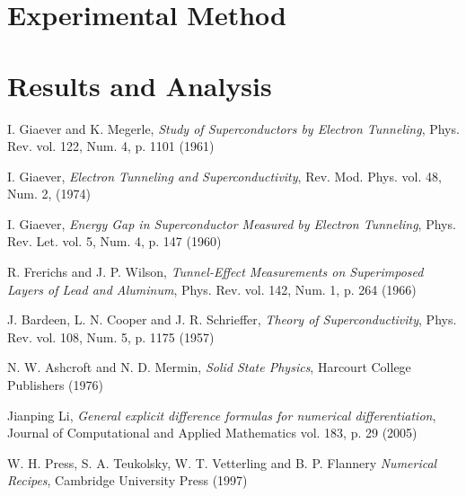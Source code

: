 \documentclass[twocolumn, twoside,a4paper,10pt]{article}
\begin{document}
\section{Experimental Method}



\section{Results and Analysis}





\begin{thebibliography}{99}

 I. Giaever and K. Megerle, \emph{Study of Superconductors by Electron Tunneling}, Phys. Rev. vol. 122, Num. 4, p. 1101 (1961)

 I. Giaever, \emph{Electron Tunneling and Superconductivity}, Rev. Mod. Phys. vol. 48, Num. 2, (1974)

 I. Giaever, \emph{Energy Gap in Superconductor Measured by Electron Tunneling}, Phys. Rev. Let. vol. 5, Num. 4, p. 147 (1960)

 R. Frerichs and J. P. Wilson, \emph{Tunnel-Effect Measurements on Superimposed Layers of Lead and Aluminum}, Phys. Rev. vol. 142, Num. 1, p. 264 (1966)

 J. Bardeen, L. N. Cooper and J. R. Schrieffer, \emph{Theory of Superconductivity}, Phys. Rev. vol. 108, Num. 5, p. 1175 (1957)

 N. W. Ashcroft and N. D. Mermin, \emph{Solid State Physics}, Harcourt College Publishers (1976)

 Jianping Li, \emph{General explicit difference formulas for numerical differentiation}, Journal of Computational and Applied Mathematics vol. 183, p. 29 (2005)

 W. H. Press, S. A. Teukolsky, W. T. Vetterling and B. P. Flannery \emph{Numerical Recipes},  Cambridge University Press (1997)



\end{thebibliography}

\end{document}
